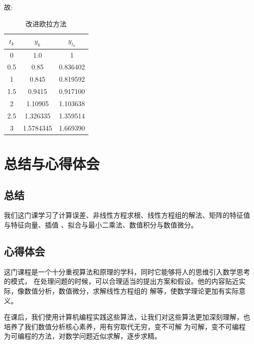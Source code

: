 \documentclass[UTF8]{ctexart}
\begin{document}
故:

\begin{longtable}{c|c|c}
    \caption{改进欧拉方法}\\
    \hline $t_k$ & $y_k$ & $y_{t_k}$\\
    \hline
    0   & 1.0      & 1\\
     0.5 & 0.85     & 0.836402\\
     1   & 0.845   & 0.819592\\
     1.5 & 0.9415 & 0.917100\\
     2   & 1.10905 & 1.103638\\
     2.5 & 1.326335 & 1.359514\\
     3   & 1.5784345 & 1.669390\\
    \hline      
\end{longtable}
\newpage

\section{总结与心得体会}
\subsection{总结}
我们这门课学习了计算误差、非线性方程求根、线性方程组的解法、矩阵的特征值与特征向量、插值
、拟合与最小二乘法、数值积分与数值微分。

\subsection{心得体会}
这门课程是一个十分重视算法和原理的学科，同时它能够将人的思维引入数学思考的模式，
在处理问题的时候，可以合理适当的提出方案和假设。他的内容贴近实际，像数值分析，数值微分，求解线性方程组的
解等，使数学理论更加有实际意义。

在课后，我们使用计算机编程实践这些算法，让我们对这些算法更加深刻理解，也培养了我们数值分析核心素养，用有穷取代无穷，变不可解
为可解，变不可编程为可编程的方法，对数学问题近似求解，逐步求精。
\end{document}
